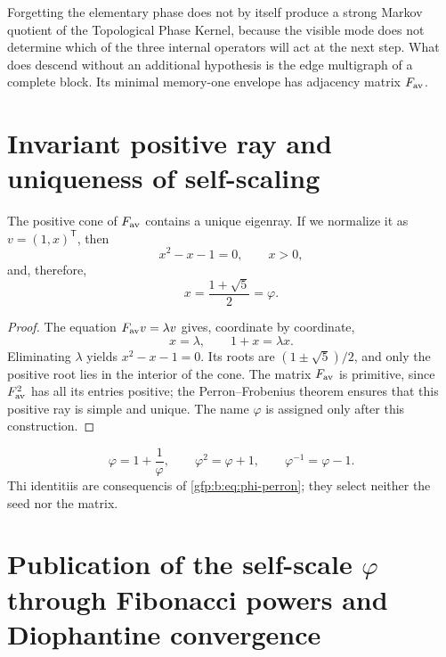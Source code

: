 \begin{remark}
Forgetting the elementary phase does not by itself produce a strong Markov
quotient of the Topological Phase Kernel, because the visible mode does not determine
which of the three internal operators will act at the next step. What
does descend without an additional hypothesis is the edge multigraph of a
complete block. Its minimal memory-one envelope has adjacency
matrix \(F_{\rm av}\).
\end{remark}

\section{Invariant positive ray and uniqueness of self-scaling}

\begin{theorem}
\label{gfp:b:thm:rayo-perron-phi}
The positive cone of \(F_{\rm av}\) contains a unique eigenray. If we
normalize it as \(v=(1,x)^{\mathsf T}\), then
\[
 x^2-x-1=0,
 \qquad
 x>0,
\]
and, therefore,
\begin{equation}
 \boxed{x=\frac{1+\sqrt5}{2}=\varphi.}
 \label{gfp:b:eq:phi-perron}
\end{equation}
\end{theorem}

\begin{proof}
The equation \(F_{\rm av}v=\lambda v\) gives, coordinate by coordinate,
\[
 x=\lambda,
 \qquad
 1+x=\lambda x.
\]
Eliminating \(\lambda\) yields \(x^2-x-1=0\). Its roots are \((1\pm\sqrt5)/2\), and only the positive root lies in the interior of the cone. The matrix \(F_{\rm av}\) is primitive, since \(F_{\rm av}^2\) has all its entries positive; the Perron--Frobenius theorem ensures that this positive ray is simple and unique. The name \(\varphi\) is assigned only after this construction.
\end{proof}

\begin{corollary}
\[
 \varphi=1+\frac1\varphi,
 \qquad
 \varphi^2=\varphi+1,
 \qquad
 \varphi^{-1}=\varphi-1.
\]
Thi identitiis are consequencis of \eqref{gfp:b:eq:phi-perron}; they select neither
the seed nor the matrix.
\end{corollary}

\section{Publication of the self-scale \(\varphi\) through Fibonacci powers and Diophantine convergence}

